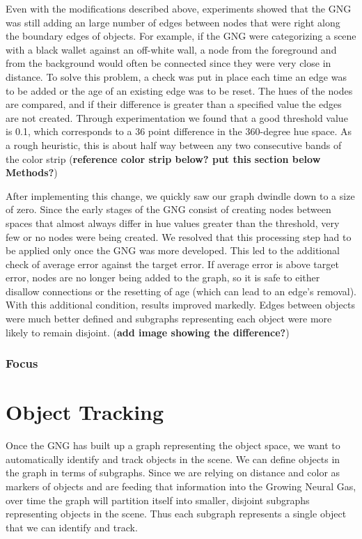 \documentclass{article}
\renewcommand{\|}{\origbar} %
\begin{document}
Even with the modifications described above, experiments showed that the GNG was still adding an large number of edges between nodes that were right along the boundary edges of objects. For example, if the GNG were categorizing a scene with a black wallet against an off-white wall, a node from the foreground and from the background would often be connected since they were very close in distance. To solve this problem, a check was put in place each time an edge was to be added or the age of an existing edge was to be reset. The hues of the nodes are compared, and if their difference is greater than a specified value the edges are not created. Through experimentation we found that a good threshold value is 0.1, which corresponds to a 36 point difference in the 360-degree hue space. As a rough heuristic, this is about half way between any two consecutive bands of the color strip ({\bf reference color strip below? put this section below Methods?})

After implementing this change, we quickly saw our graph dwindle down to a size of zero. Since the early stages of the GNG consist of creating nodes between spaces that almost always differ in hue values greater than the threshold, very few or no nodes were being created. We resolved that this processing step had to be applied only once the GNG was more developed. This led to the additional check of average error against the target error. If average error is above target error, nodes are no longer being added to the graph, so it is safe to either disallow connections or the resetting of age (which can lead to an edge's removal). With this additional condition, results improved markedly. Edges between objects were much better defined and subgraphs representing each object were more likely to remain disjoint. ({\bf add image showing the difference?})

\subsubsection{Focus}

\section{Object Tracking}
\label{sec:objectTracking}

Once the GNG has built up a graph representing the object space, we want to automatically identify and track objects in the scene. We can define objects in the graph in terms of subgraphs. Since we are relying on distance and color as markers of objects and are feeding that information into the Growing Neural Gas, over time the graph will partition itself into smaller, disjoint subgraphs representing objects in the scene. Thus each subgraph represents a single object that we can identify and track.
\end{document}
